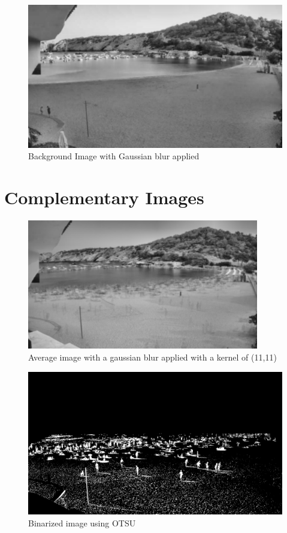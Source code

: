 \documentclass[10pt]{article}
\begin{document}
\begin{appendices}
  \begin{figure} [h]
    \centering
    \includegraphics[width=\textwidth]{../gen/blur.png}
    \caption{Background Image with Gaussian blur applied}
    \label{fig:background}
  \end{figure}


  \section{Complementary Images}

  \begin{figure}[h]
    \centering
    \includegraphics[width=0.9\textwidth]{img/avg.png}
    \caption{Average image with a gaussian blur applied with a kernel of (11,11)}
    \label{fig:avg}
  \end{figure}

  \begin{figure}[h]
    \centering
    \includegraphics[width=\textwidth]{img/OTSU_sub_arena.jpg}
    \caption{Binarized image using OTSU}
    \label{fig:otsu_bin}
  \end{figure}

\end{appendices}
\end{document}

